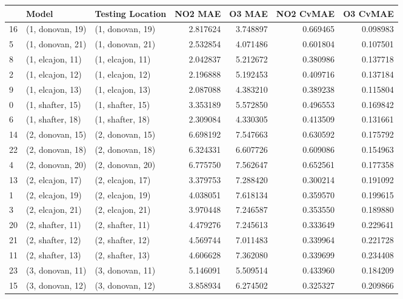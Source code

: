 \begin{tabular}{lllrrrr}
\toprule
{} &             Model &  Testing Location &   NO2 MAE &    O3 MAE &  NO2 CvMAE &  O3 CvMAE \\
\midrule
16 &  (1, donovan, 19) &  (1, donovan, 19) &  2.817624 &  3.748897 &   0.669465 &  0.098983 \\
5  &  (1, donovan, 21) &  (1, donovan, 21) &  2.532854 &  4.071486 &   0.601804 &  0.107501 \\
8  &  (1, elcajon, 11) &  (1, elcajon, 11) &  2.042837 &  5.212672 &   0.380986 &  0.137718 \\
2  &  (1, elcajon, 12) &  (1, elcajon, 12) &  2.196888 &  5.192453 &   0.409716 &  0.137184 \\
9  &  (1, elcajon, 13) &  (1, elcajon, 13) &  2.087088 &  4.383210 &   0.389238 &  0.115804 \\
0  &  (1, shafter, 15) &  (1, shafter, 15) &  3.353189 &  5.572850 &   0.496553 &  0.169842 \\
6  &  (1, shafter, 18) &  (1, shafter, 18) &  2.309084 &  4.330305 &   0.413509 &  0.131661 \\
14 &  (2, donovan, 15) &  (2, donovan, 15) &  6.698192 &  7.547663 &   0.630592 &  0.175792 \\
22 &  (2, donovan, 18) &  (2, donovan, 18) &  6.324331 &  6.607726 &   0.609086 &  0.154963 \\
4  &  (2, donovan, 20) &  (2, donovan, 20) &  6.775750 &  7.562647 &   0.652561 &  0.177358 \\
13 &  (2, elcajon, 17) &  (2, elcajon, 17) &  3.379753 &  7.288420 &   0.300214 &  0.191092 \\
1  &  (2, elcajon, 19) &  (2, elcajon, 19) &  4.038051 &  7.618134 &   0.359570 &  0.199615 \\
3  &  (2, elcajon, 21) &  (2, elcajon, 21) &  3.970448 &  7.246587 &   0.353550 &  0.189880 \\
20 &  (2, shafter, 11) &  (2, shafter, 11) &  4.479276 &  7.245613 &   0.333649 &  0.229641 \\
21 &  (2, shafter, 12) &  (2, shafter, 12) &  4.569744 &  7.011483 &   0.339964 &  0.221728 \\
11 &  (2, shafter, 13) &  (2, shafter, 13) &  4.606628 &  7.362080 &   0.339699 &  0.234408 \\
23 &  (3, donovan, 11) &  (3, donovan, 11) &  5.146091 &  5.509514 &   0.433960 &  0.184209 \\
15 &  (3, donovan, 12) &  (3, donovan, 12) &  3.858934 &  6.274502 &   0.325327 &  0.209866 \\

\end{tabular}
